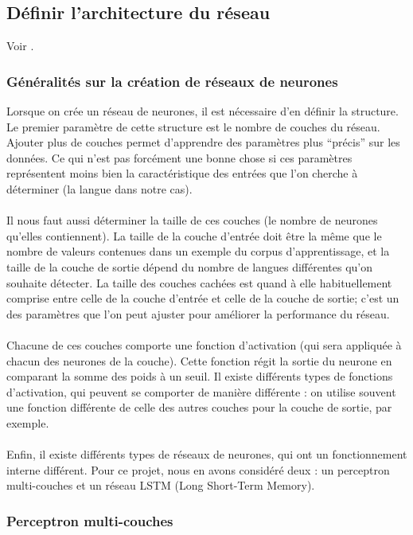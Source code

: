 \documentclass{article}
\begin{document}
\subsection{Définir l'architecture du réseau}

Voir \cite{lecun2015}.

\subsubsection{Généralités sur la création de réseaux de neurones}
Lorsque on crée un réseau de neurones, il est nécessaire d'en définir la structure. Le premier paramètre de cette structure est le nombre de couches du réseau. Ajouter plus de couches permet d'apprendre des paramètres plus ``précis'' sur les données. Ce qui n'est pas forcément une bonne chose si ces paramètres représentent moins bien la caractéristique des entrées que l'on cherche à déterminer (la langue dans notre cas).\\
 \\
Il nous faut aussi déterminer la taille de ces couches (le nombre de neurones qu'elles contiennent). La taille de la couche d'entrée doit être la même que le nombre de valeurs contenues dans un exemple du corpus d'apprentissage, et la taille de la couche de sortie dépend du nombre de langues différentes qu'on souhaite détecter. La taille des couches cachées est quand à elle habituellement comprise entre celle de la couche d'entrée et celle de la couche de sortie; c'est un des paramètres que l'on peut ajuster pour améliorer la performance du réseau.\\
 \\
Chacune de ces couches comporte une fonction d'activation (qui sera appliquée à chacun des neurones de la couche). Cette fonction régit la sortie du neurone en comparant la somme des poids à un seuil. Il existe différents types de fonctions d'activation, qui peuvent se comporter de manière différente : on utilise souvent une fonction différente de celle des autres couches pour la couche de sortie, par exemple.\\
 \\
Enfin, il existe différents types de réseaux de neurones, qui ont un fonctionnement interne différent.  Pour ce projet, nous en avons considéré deux : un perceptron multi-couches et un réseau LSTM (Long Short-Term Memory).
 
\subsubsection{Perceptron multi-couches}
\end{document}
